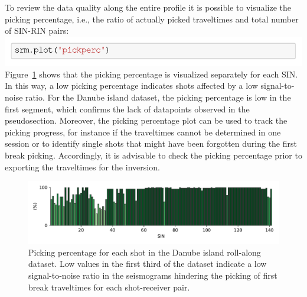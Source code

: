 \documentclass[a4paper,fleqn]{cas-sc}
\begin{document}
To review the data quality along the entire profile it is possible to visualize the picking percentage, i.e., the ratio of actually picked traveltimes and total number of SIN-RIN pairs:
\newline
\includegraphics[width=.5\textwidth]{./figures/plot_pickperc_danube.pdf}
\newline
Figure~\ref{fig:rollalong_pickperc} shows that the picking percentage is visualized separately for each SIN. In this way, a low picking percentage indicates shots affected by a low signal-to-noise ratio. For the Danube island dataset, the picking percentage is low in the first segment, which confirms the lack of datapoints observed in the pseudosection. Moreover, the picking percentage plot can be used to track the picking progress, for instance 
if the traveltimes cannot be determined in one session or 
to identify single shots that might have been forgotten during the first break picking. Accordingly, it is advisable to check the picking percentage prior to exporting the traveltimes for the inversion.

\begin{figure}
	\centering
	\includegraphics[width=.75\textwidth]{figures/rollalong_pickperc.pdf}
	\caption{Picking percentage for each shot in the Danube island roll-along dataset. Low values in the first third of the dataset indicate a low signal-to-noise ratio in the seismograms hindering the picking of first break traveltimes for each shot-receiver pair.}
	\label{fig:rollalong_pickperc}
\end{figure}
\end{document}
